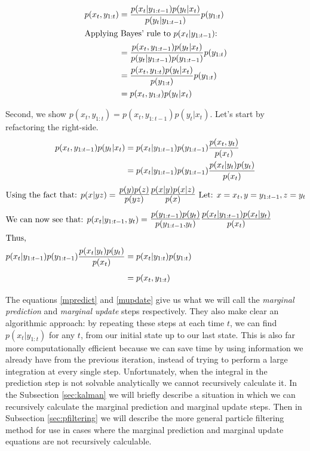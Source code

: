 \documentclass{article}
\begin{document}
\begin{align*}
p(x_t,y_{1:t}) &= \frac{p(x_t|y_{1:t-1})p(y_t|x_t)}{p(y_t|y_{1:t-1})}p(y_{1:t}) \\
\intertext{Applying Bayes' rule to $p(x_t|y_{1:t-1})$:}
&= \frac{p(x_t,y_{1:t-1})p(y_t|x_t)}{p(y_t|y_{1:t-1})p(y_{1:t-1})}p(y_{1:t}) \\
&= \frac{p(x_t,y_{1:t})p(y_t|x_t)}{p(y_{1:t})}p(y_{1:t}) \\
&= p(x_t,y_{1:t})p(y_t|x_t)
\end{align*}

\noindent
Second, we show $p(x_t,y_{1:t}) = p(x_t,y_{1:t-1})p(y_t|x_t)$. Let's start by refactoring the right-side.
\begin{align*}
p(x_t,y_{1:t-1})p(y_t|x_t) 
&= p(x_t|y_{1:t-1})p(y_{1:t-1})\frac{p(x_t,y_t)}{p(x_t)}\\
&= p(x_t|y_{1:t-1})p(y_{1:t-1})\frac{p(x_t|y_t)p(y_t)}{p(x_t)}\\
\intertext{Using the fact that: $p(x|yz) =$ {\Large $\frac{p(y)p(z)}{p(yz)}\frac{p(x|y)p(x|z)}{p(x)}$}
  Let: $x=x_t, y=y_{1:t-1}, z = y_t$}
\intertext{We can now see that:  $p(x_t|y_{1:t-1},y_t) =$ {\Large $\frac{p(y_{1:t-1})p(y_t)}{p(y_{1:t-1},y_t)}\frac{p(x_t|y_{1:t-1})p(x_t|y_t)}{p(x_t)}$}}
\intertext{Thus,}
p(x_t|y_{1:t-1})p(y_{1:t-1})\frac{p(x_t|y_t)p(y_t)}{p(x_t)} 
&= p(x_t|y_{1:t})p(y_{1:t})\\
&= p(x_t,y_{1:t})\\
\end{align*}

The equations \eqref{mpredict} and \eqref{mupdate} give us what we will call the \textit{marginal prediction} and \textit{marginal update} steps respectively. They also make clear an algorithmic approach: by repeating these steps at each time $t$, we can find
$p(x_t|y_{1:t})$ for any $t$, from our initial state up to our last state. This is also far more computationally efficient because we can save time by using information we already have from the previous iteration, instead of trying to perform a large integration at every single step. Unfortunately, when the integral in the prediction step is not solvable analytically we cannot recursively calculate it. In the Subsection \ref{sec:kalman} we will briefly describe a situation in which we can recursively calculate the marginal prediction and marginal update steps. Then in Subsection \ref{sec:pfiltering} we will describe the more general particle filtering method for use in cases where the marginal prediction and marginal update equations are not recursively calculable.
\end{document}
